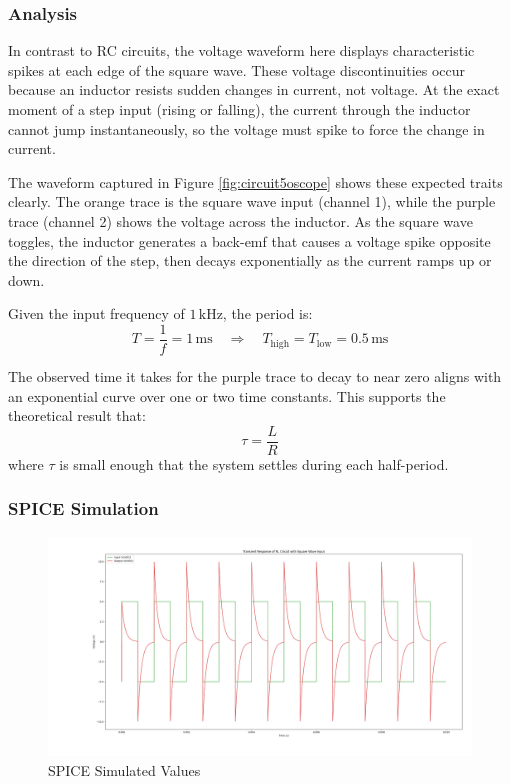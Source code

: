 \documentclass[12pt]{article}
\begin{document}
\subsubsection{Analysis}
In contrast to RC circuits, the voltage waveform here displays characteristic spikes at each edge of the square wave. These voltage discontinuities occur because an inductor resists sudden changes in current, not voltage. At the exact moment of a step input (rising or falling), the current through the inductor cannot jump instantaneously, so the voltage must spike to force the change in current.

The waveform captured in Figure \ref{fig:circuit5oscope} shows these expected traits clearly. The orange trace is the square wave input (channel 1), while the purple trace (channel 2) shows the voltage across the inductor. As the square wave toggles, the inductor generates a back-emf that causes a voltage spike opposite the direction of the step, then decays exponentially as the current ramps up or down.

Given the input frequency of $1\,\mathrm{kHz}$, the period is:
\[
	T = \frac{1}{f} = 1\,\mathrm{ms}
	\quad \Rightarrow \quad
	T_{\text{high}} = T_{\text{low}} = 0.5\,\mathrm{ms}
\]

The observed time it takes for the purple trace to decay to near zero aligns with an exponential curve over one or two time constants. This supports the theoretical result that:
\[
	\tau = \frac{L}{R}
\]
where $\tau$ is small enough that the system settles during each half-period.

\subsubsection{SPICE Simulation}

\begin{figure}[H]
	\centering
	\includegraphics[width=16cm]{05_ltspicecircuit5}
	\caption{SPICE Simulated Values}
	\label{fig:circuit5pspice}
\end{figure}
\end{document}
